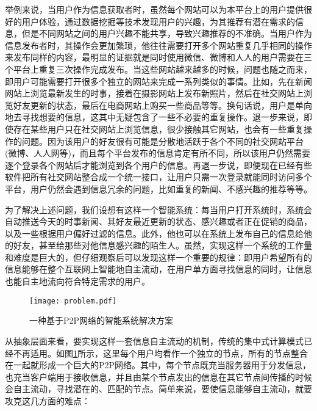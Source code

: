 举例来说，当用户作为信息获取者时，虽然每个网站可以为本平台上的用户提供很好的用户体验，通过数据挖掘等技术发现用户的兴趣，为其推荐有潜在需求的信息，但是不同网站之间的用户兴趣不能共享，导致兴趣推荐的不准确。当用户作为信息发布者时，其操作会更加繁琐，他往往需要打开多个网站重复几乎相同的操作来发布同样的内容，最明显的证据就是同时使用微信、微博和人人的用户需要在三个平台上重复三次操作完成发布。当这些网站越来越多的时候，问题也随之而来，即用户可能需要打开很多个独立的网站来完成一系列类似的事情。比如，先在新闻网站上浏览最新发生的时事，接着在摄影网站上发布新照片，然后在社交网站上浏览好友更新的状态，最后在电商网站上购买一些商品等等。换句话说，用户是单向地去寻找想要的信息，这其中无疑包含了一些不必要的重复操作。退一步来说，即使存在某些用户只在社交网站上浏览信息，很少接触其它网站，也会有一些重复操作的问题。因为该用户的好友很有可能是分散地活跃于各个不同的社交网站平台(微博、人人网等)，而且每个平台发布的信息肯定有所不同，所以该用户仍然需要逐个登录各个网站后才能浏览到各个用户的信息。再退一步说，即便现在已经有些软件把所有社交网站整合成一个统一接口，让用户只需一次登录就能同时访问多个平台，用户仍然会遇到信息冗余的问题，比如重复的新闻、不感兴趣的推荐等等。

为了解决上述问题，我们设想有这样一个智能系统：每当用户打开系统时，系统会自动推送今天的时事新闻、其好友最近更新的状态、感兴趣或者正在促销的商品，以及一些根据用户偏好过滤的信息。此外，他也可以在系统上发布自己的信息给他的好友，甚至给那些对他信息感兴趣的陌生人。虽然，实现这样一个系统的工作量和难度是巨大的，但仔细观察后可以发现这样一个重要的规律：即用户希望所有的信息能够在整个互联网上智能地自主流动，在用户单方面寻找信息的同时，让信息也能自主地流向符合特定需求的用户。

\begin{figure}
\centering
\texttt{[image: problem.pdf]}
\caption{一种基于P2P网络的智能系统解决方案}
\label{fig:solution}
\end{figure}

从抽象层面来看，要实现这样一套信息自主流动的机制，传统的集中式计算模式已经不再适用。如图\ref{fig:solution}所示，这里每个用户均看作一个独立的节点，所有的节点整合在一起就形成一个巨大的P2P网络。其中，每个节点既充当服务器用于分发信息，也充当客户端用于接收信息，并且由某个节点发出的信息在其它节点间传播的时候会自主流动，寻找潜在的、匹配的节点。简单来说，要使信息能够自主流动，就要攻克这几方面的难点：

